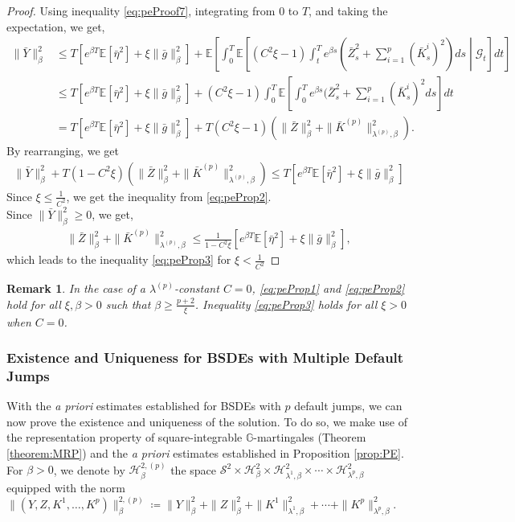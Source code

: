 \documentclass[11pt,a4paper]{article}
\numberwithin{equation}{section}
\theoremstyle{newPlain}
\theoremstyle{newDefinition}
\theoremstyle{newRemark}
\newtheorem{remark}[theorem]{Remark}
\begin{document}
{\begin{proof}
    Using inequality \eqref{eq:peProof7}, integrating from $0$ to $T$, and taking the expectation, we get,
    \begin{align*}
        \|\bar{Y}\|_\beta^2&\le T\left[e^{\beta T}\mathbb{E}[\bar{\eta}^2]+\xi\|\bar{g}\|_\beta^2\right] + \mathbb{E}\left[\int_0^T\mathbb{E}\left[(C^2\xi - 1)\int_t^Te^{\beta s}(\bar{Z}_s^2+\sum_{i=1}^p(\bar{K}_s^i)^2)ds\middle|\mathcal{G}_t\right]dt\right]\\
        &\le T\left[e^{\beta T}\mathbb{E}[\bar{\eta}^2]+\xi\|\bar{g}\|_\beta^2\right] + (C^2\xi-1)\int_0^T\mathbb{E}\left[\int_0^Te^{\beta s}(\bar{Z}_s^2+\sum_{i=1}^p(\bar{K}_s^i)^2ds\right]dt\\
        &=T\left[e^{\beta T}\mathbb{E}[\bar{\eta}^2]+\xi\|\bar{g}\|_\beta^2\right] + T(C^2\xi - 1)(\|\bar{Z}\|_\beta^2+\|\bar{K}^{(p)}\|_{\lambda^{(p)},\beta}^2).
    \end{align*}
    By rearranging, we get
    \begin{align*}
        \|\bar{Y}\|_\beta^2 + T(1 - C^2\xi)(\|\bar{Z}\|_\beta^2+\|\bar{K}^{(p)}\|_{\lambda^{(p)},\beta}^2) \le T\left[e^{\beta T}\mathbb{E}[\bar{\eta}^2]+\xi\|\bar{g}\|_\beta^2\right] 
    \end{align*}
    Since $\xi\le\frac{1}{C^2}$,  we get  the inequality from \eqref{eq:peProp2}.\\
   Since $\|\bar{Y}\|_\beta^2\ge0$, we get,
    \begin{align*}
        \|\bar{Z}\|_\beta^2+\|\bar{K}^{(p)}\|_{\lambda^{(p)},\beta}^2 \le \frac{1}{1 - C^2\xi}\left[e^{\beta T}\mathbb{E}[\bar{\eta}^2]+\xi\|\bar{g}\|_\beta^2\right],
    \end{align*}
    which leads to the inequality \eqref{eq:peProp3} for $\xi<\frac{1}{C^2}$
    
\end{proof}

\begin{remark}\label{remark:PE}
   In the case of a $\lambda^{(p)}$-constant $C=0$, \eqref{eq:peProp1} and \eqref{eq:peProp2} hold for all $\xi,\beta>0$ such that $\beta\ge\frac{p+2}{\xi}$. Inequality \eqref{eq:peProp3} holds for all $\xi>0$ when $C=0$.
\end{remark}

\subsubsection{Existence and Uniqueness for BSDEs with Multiple Default Jumps}

With the \emph{a priori} estimates established for BSDEs with $p$ default jumps, we can now prove the existence and uniqueness of the solution. To do so, we make use of the representation property of square-integrable  $\mathbb{G}$-martingales (Theorem \ref{theorem:MRP}) and the \emph{a priori} estimates established in Proposition \ref{prop:PE}.\\
For $\beta>0$, we denote by $\mathcal{H}_\beta^{2,(p)}$ the space $\mathcal{S}^2\times\mathcal{H}_\beta^2\times\mathcal{H}_{\lambda^1,\beta}^2\times\cdots\times\mathcal{H}_{\lambda^p,\beta}^2$ equipped with the norm $\|\left(Y,Z,K^1,\ldots,K^p\right)\|_\beta^{2,(p)}\coloneqq\|Y\|_\beta^2+\|Z\|_\beta^2+\|K^1\|_{\lambda^1,\beta}^2+\cdots+\|K^p\|_{\lambda^p,\beta}^2$.

}
\end{document}
